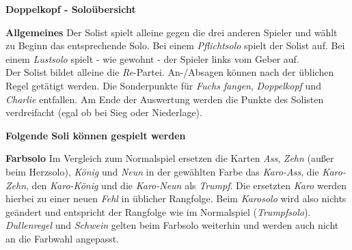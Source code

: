\documentclass[11pt,a4paper,landscape]{article}
\begin{document}
\begin{center}
\textbf{Doppelkopf - Soloübersicht}
\end{center}

\begin{multicols}{3}


\textbf{Allgemeines} Der Solist spielt alleine gegen die drei anderen Spieler und wählt zu Beginn das entsprechende Solo. Bei einem \textit{Pflichtsolo} spielt der Solist auf. Bei einem \textit{Lustsolo} spielt - wie gewohnt - der Spieler links vom Geber auf. \\
Der Solist bildet alleine die \textit{Re}-Partei. An-/Absagen können nach der üblichen Regel getätigt werden. Die Sonderpunkte für \textit{Fuchs fangen}, \textit{Doppelkopf} und \textit{Charlie} entfallen. Am Ende der Auswertung werden die Punkte des Solisten verdreifacht (egal ob bei Sieg oder Niederlage). 

\begin{center}
\textbf{Folgende Soli können gespielt werden} \\
\end{center}

\textbf{Farbsolo} Im Vergleich zum Normalspiel ersetzen die Karten \textit{Ass}, \textit{Zehn} (außer beim Herzsolo), \textit{König} und \textit{Neun} in der gewählten Farbe das \textit{Karo-Ass}, die \textit{Karo-Zehn}, den \textit{Karo-König} und die \textit{Karo-Neun} als \textit{Trumpf}. Die ersetzten \textit{Karo} werden hierbei zu einer neuen \textit{Fehl} in üblicher Rangfolge. Beim \textit{Karosolo} wird also nichts geändert und entspricht der Rangfolge wie im Normalspiel (\textit{Trumpfsolo}). \textit{Dullenregel} und \textit{Schwein} gelten beim Farbsolo weiterhin und werden auch nicht an die Farbwahl angepasst.


\end{multicols}
\end{document}
